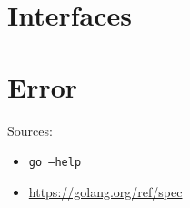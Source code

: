\documentclass{article}
\begin{document}
\begin{multicols*}{3}
  \filbreak
  \section*{Interfaces}

  \filbreak
  \section*{Error}

  \parbox{\columnwidth}{
    Sources:
    \begin{itemize}[nosep]
    \item \texttt{go --help}
    \item \url{https://golang.org/ref/spec}
    \end{itemize}

    \vspace{\baselineskip}
    \begin{center}
      \doclicenseText\\[0.25\baselineskip]

      \doclicenseImage
    \end{center}
  }
\end{multicols*}
\end{document}
